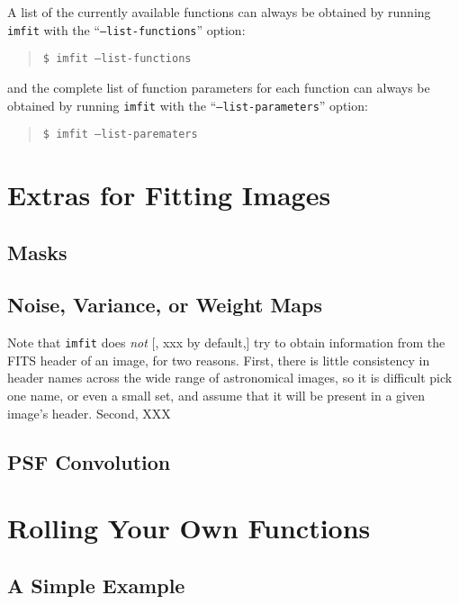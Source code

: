 \documentclass[10pt]{article}
\newcommand{\imfit}{\texttt{imfit}}
\begin{document}
A list of the currently available functions can always be obtained
by running \imfit{} with the ``\texttt{--list-functions}'' option:
\begin{quote}
  \texttt{\$ \imfit{} --list-functions}
\end{quote}
and the complete list of function parameters for each function can always be
obtained by running \imfit{} with the ``\texttt{--list-parameters}'' option:
\begin{quote}
  \texttt{\$ \imfit{} --list-parematers}
\end{quote}




\section{Extras for Fitting Images}

\subsection{Masks}

\subsection{Noise, Variance, or Weight Maps}

Note that \imfit{} does \textit{not} [, xxx by default,] try to obtain information
from the FITS header of an image, for two reasons. First, there is little
consistency in header names across the wide range of astronomical images, so
it is difficult pick one name, or even a small set, and assume that it will
be present in a given image's header. Second, XXX


\subsection{PSF Convolution}




\section{Rolling Your Own Functions}

\subsection{A Simple Example}
\end{document}

